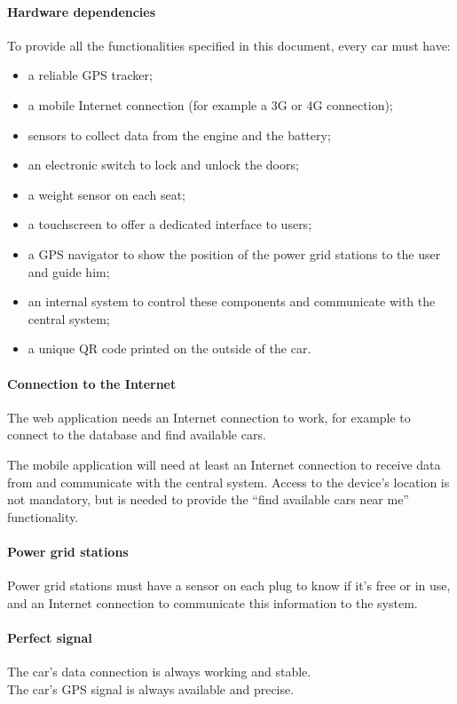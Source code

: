 \documentclass[english]{article}
\begin{document}
\paragraph{Hardware dependencies}
To provide all the functionalities specified in this document, every car must have:
\begin{itemize}
	\item{a reliable GPS tracker;}
	\item{a mobile Internet connection (for example a 3G or 4G connection);}
	\item{sensors to collect data from the engine and the battery;}
	\item{an electronic switch to lock and unlock the doors;}
	\item{a weight sensor on each seat;}
	\item{a touchscreen to offer a dedicated interface to users;}
	\item{a GPS navigator to show the position of the power grid stations to the user and guide him;}
	\item{an internal system to control these components and communicate with the central system;}
	\item{a unique QR code printed on the outside of the car.}
\end{itemize}

\paragraph{Connection to the Internet}
The web application needs an Internet connection to work, for example to connect to the database and find available cars.

The mobile application will need at least an Internet connection to receive data from and communicate with the central system. Access to the device’s location is not mandatory, but is needed to provide the “find available cars near me” functionality.

\paragraph{Power grid stations}
Power grid stations must have a sensor on each plug to know if it's free or in use, and an Internet connection to communicate this information to the system.





\paragraph{Perfect signal}
The car’s data connection is always working and stable. \\
The car’s GPS signal is always available and precise.
\end{document}
